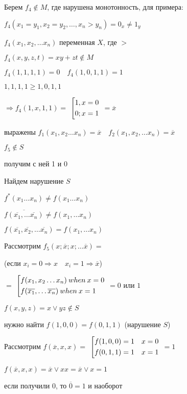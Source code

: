 \documentclass[russian]{lecture-notes}
\begin{document}
	Берем $f_4 \notin M$, где нарушена монотонность, для примера:
	
	$f_4(x_1 = y_1, x_2 = y_2, \dots, x_n > y_n) = 0_x \neq 1_y$
	
	$f_4(x_1, x_2, \dots x_n)$ переменная $X$, где $>$ 
	
	$f_4(x, y, z, t) = xy + zt \notin M$
	
	$f_4(1, 1, 1, 1) = 0 \quad f_4(1, 0, 1, 1) = 1$
	
	$1, 1, 1, 1 \geq 1, 0, 1, 1$
	
	$\Rightarrow f_4(1, x, 1, 1) = $
	$\left[ 
  		\begin{gathered} 
    			1, x = 0 \hfill 
        \\ 
        		0; x = 1 \hfill 
        \\ 
	  	\end{gathered} 
	\right.$
	$ = \overline{x}$


	выражены $f_1(x_1, x_2 \dots x_n) = \overline{x} \quad f_2(x_1, x_2, \dots x_n) = \overline{x}$
	
	$f_5 \notin S$
	
	получим с ней 1 и 0
	
	Найдем нарушение $S$
	
	$f^*(x_1 \dots x_n) \neq f(x_1 \dots x_n)$
	
	$\overline{f(\overline{x_1}, \dots \overline{x_n})} \neq f(x_1, \dots x_n)$
	
	$f(\overline{x_1}, \overline{x_2}, \dots \overline{x_n}) = f(x_1, \dots x_n)$
	
	Рассмотрим $f_5(x; \overline{x}; x; \dots \overline{x}) = $ 
	
	(если $x_i = 0 \Rightarrow x \quad x_i = 1 \Rightarrow \overline{x}$)
	
	$= $
	$\left[ 
  		\begin{gathered} 
    			f(x_1, x_2 \dots x_n) \: when \: x = 0 \hfill 
        \\ 
        		f(\overline{x_1}, \dots \overline{x_n}) \: when \: x = 1 \hfill 
        \\ 
	  	\end{gathered} 
	\right.$
	$ = 0$ или $1$
	
\begin{example}
	$f(x, y, z) = x \lor yz \notin S$
	
	нужно найти $f(1, 0, 0) = f(0, 1, 1)$ (нарушение $S$)
	
	Рассмотрим $f(\overline{x}, x, x) = $
	$\left[ 
  		\begin{gathered} 
    			f(1, 0, 0) = 1 \quad x = 0 \hfill 
        \\ 
        		f(0, 1, 1) = 1 \quad x = 1 \hfill 
        \\ 
	  	\end{gathered} 
	\right.$
	$ = 1$
	
	$f(\overline{x}, x, x) = \overline{x} \lor xx = \overline{x} \lor x = 1$
	
	если получили 0, то $\overline{0} = 1$ и наоборот
\end{example}
\end{document}
